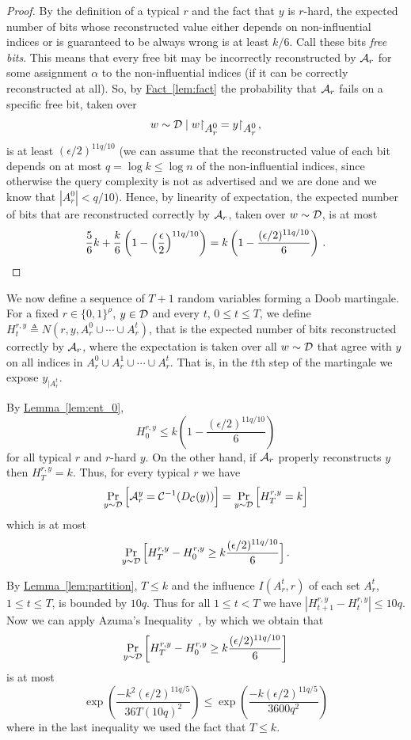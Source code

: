 \documentclass[10pt]{article}
\theoremstyle{definition}
\numberwithin{equation}{section}
\newcommand{\expref}[2]{\texorpdfstring{\hyperref[#2]{#1~\ref{#2}}}{#1~\ref{#2}}}
\newcommand{\ALG}{{\cal A}}
\newcommand{\DD}{{\cal D}}
\newcommand{\CC}{{\cal C}}
\newcommand{\zo}{{\{0,1\}}}
\newcommand{\DEC}{{D_{\cal C}}}
\newcommand{\rst}[1]{\ensuremath{{\mathbin\upharpoonright}%
\raise-.9ex\hbox{$#1$}}}
\begin{document}
\begin{proof} By the definition of a typical $r$ and the fact that $y$ is $r$-hard,
the expected number of bits whose reconstructed value either depends
on non-influential indices or is guaranteed to be always wrong is at
least $k/6$. Call these bits \emph{free bits}. This means that every
free bit may be incorrectly reconstructed by $\ALG_r$ for some
assignment $\alpha$ to the non-influential indices (if it can be
correctly reconstructed at all). So, by \expref{Fact}{lem:fact} the
probability that $\ALG_r$ fails on a specific free bit, taken over
\[
w \sim \DD \mid w\rst{A_r^0} = y\rst{A_r^0}\,,
\]
is at least $(\epsilon/2)^{11q/10}$ (we can assume that the reconstructed value of each bit depends on at most $q = \log k \leq \log n$ of the non-influential indices, since otherwise the query complexity is not as advertised and we are done and we know that $|A_r^0|< q/10$). Hence, by linearity of expectation, the expected number of bits that are reconstructed correctly by $\ALG_r$, taken over $w \sim \DD$, is at most
\[
\frac{5}{6}k + \frac{k}{6}\left(1-\left(\frac{\epsilon}{2}\right)^{11q/10}\right)
= k\left(1-\frac{(\epsilon/2)^{11q/10}}{6}\right)\,.\qedhere
\]
\end{proof}

We now define a sequence of $T + 1$ random variables forming a Doob martingale. For a fixed $r \in \zo^\rho$, $y \in \DD$ and every $t$, $0 \leq t \leq T$, we define $H^{r,y}_t \triangleq N(r,y, A_r^0 \cup \cdots \cup A_r^t)$, that is the expected number of bits reconstructed correctly by $\ALG_r$, where the expectation is taken over all $w \sim \DD$ that agree with $y$ on all indices in $A_r^0 \cup A_r^1 \cup \cdots \cup A_r^t$. That is, in the $t$th step of the martingale we expose $y_{|A_r^t}$.

By \expref{Lemma}{lem:ent_0},
\[
H^{r,y}_0 \leq k\left(1-\frac{(\epsilon/2)^{11q/10}}{6}\right)
\]
for all typical $r$ and $r$-hard $y$. On the other hand, if $\ALG_r$ properly reconstructs $y$ then $H^{r,y}_T=k$. Thus, for every typical $r$ we have
\[
\Pr_{y \sim \DD}\Big[\ALG^y_r = \CC^{-1}(\DEC(y))\Big] = \Pr_{y \sim
  \DD}\Big[H^{r,y}_T = k\Big]
\]
which is at most
\[
\Pr_{y \sim
  \DD}\Big[H^{r,y}_T - H^{r,y}_0 \geq k
\frac{(\epsilon/2)^{11q/10}}{6}\Big]\,.
\]




By \expref{Lemma}{lem:partition}, $T \leq k$ and the influence $I(A_r^t,r)$ of each set $A_r^t$, $1 \leq t \leq T$, is bounded by $10q$. Thus for all $1 \leq t < T$ we have $|H^{r,y}_{t+1} - H^{r,y}_{t}| \leq 10q$. Now we can apply Azuma's Inequality~\cite{alon}, by which we obtain that $$\Pr_{y \sim \DD}\left[H^{r,y}_{T} - H^{r,y}_0 \geq k \frac{(\epsilon/2)^{11q/10}}{6} \right]$$ is at most
$$\exp\left(\frac{-k^2(\epsilon/2)^{11q/5}}{36 T (10q)^2}\right) \leq \exp\left(\frac{-k(\epsilon/2)^{11q/5}}{3600 q^2}\right)$$ where in the last inequality we used the fact that $T \leq k$.
\end{document}
